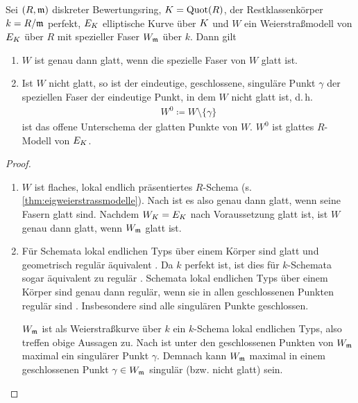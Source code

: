 \begin{Lemma}\label{thm:weierstrassglatt}
  Sei $(R,\mathfrak{m})$ diskreter Bewertungsring,
  $K=\operatorname{Quot}(R)$,
  der Restklassenkörper $k=R/\mathfrak{m}$ perfekt,
  $E_{K}$ elliptische Kurve über $K$ und
  $W$ ein Weierstraßmodell von $E_{K}$ über $R$
  mit spezieller Faser $W_{\mathfrak{m}}$ über $k$.
  Dann gilt
  \begin{enumerate}[label=(\alph*)]
  \item $W$ ist genau dann glatt, wenn die spezielle Faser von $W$ glatt
    ist.
  \item Ist $W$ nicht glatt, so ist der eindeutige, geschlossene,
    singuläre Punkt $\gamma$ der speziellen Faser der eindeutige
    Punkt, in dem $W$ nicht glatt ist, d.\,h.
    \begin{gather*}
      W^0\coloneqq W\setminus \{\gamma\}
    \end{gather*}
    ist das offene Unterschema der glatten Punkte von $W$.
    $W^0$ ist glattes $R$-Modell von $E_{K}$.
  \end{enumerate}
  \begin{proof}
    \begin{enumerate}[label=(\alph*)]
    \item $W$ ist flaches, lokal endlich präsentiertes
      $R$-Schema (s. \ref{thm:eigweierstrassmodelle}).
      Nach \cite[8.5, Proposition 17]{bosch} ist es also genau dann
      glatt, wenn seine Fasern glatt sind.
      Nachdem $W_{K}=E_{K}$ nach Voraussetzung glatt ist, ist $W$ genau
      dann glatt, wenn $W_{\mathfrak{m}}$ glatt ist.
    \item Für Schemata lokal endlichen Typs über einem Körper sind
      glatt und geometrisch regulär äquivalent
      \cite[Corollary 6.32]{wedhorn}.
      Da $k$ perfekt ist, ist dies für $k$-Schemata sogar
      äquivalent zu regulär
      \cite[Remark 6.33]{wedhorn}.
      Schemata lokal endlichen Typs über einem Körper sind genau dann
      regulär, wenn sie in allen geschlossenen Punkten regulär sind
      \cite[Remark 6.25 (3)]{wedhorn}. Insbesondere sind alle
      singulären Punkte geschlossen.

      $W_{\mathfrak{m}}$ ist als Weierstraßkurve über $k$ ein $k$-Schema
      lokal endlichen Typs, also treffen obige Aussagen zu.
      Nach \cite[Proposition III.1.4]{silverman} ist unter den
      geschlossenen Punkten von $W_{\mathfrak{m}}$ maximal ein singulärer Punkt
      $\gamma$. Demnach kann $W_{\mathfrak{m}}$ maximal in einem geschlossenen
      Punkt $\gamma\in W_{\mathfrak{m}}$ singulär (bzw. nicht glatt) sein.


\end{enumerate}
\end{proof}
\end{Lemma}
